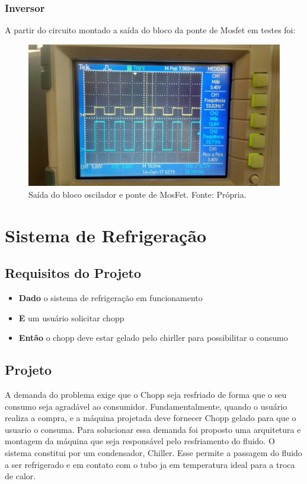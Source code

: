     \subsubsection[Inversor]{Inversor}
    
        A partir do circuito montado a saída do bloco da ponte de Mosfet em testes foi:
        
        \begin{figure}[!htb]
            \centering
            \includegraphics[scale= 0.2]{figuras/saida_inversor.jpg}
            \caption{Saída do bloco oscilador e ponte de MosFet. Fonte: Própria.}
            \label{saida-inversor}
        \end{figure}    

    \section[Sistema de Refrigeração]{Sistema de Refrigeração}
        \subsection[Requisitos do Projeto]{Requisitos do Projeto}
        
        \begin{itemize}
            \item \textbf{Dado} o sistema de refrigeração em funcionamento
            \item \textbf{E} um usuário solicitar chopp
            \item \textbf{Então} o chopp deve estar gelado pelo chirller para possibilitar o consumo
        \end{itemize}

        \subsection[Projeto]{Projeto}
            A demanda do problema exige que o Chopp seja resfriado de forma que o seu
            consumo seja agradável ao consumidor. Fundamentalmente, quando o usuário realiza
            a compra, e a máquina projetada deve fornecer Chopp gelado para que o usuario o
            consuma. Para solucionar essa demanda foi proposto uma arquitetura e montagem da
            máquina que seja responsável pelo resfriamento do fluido. O sistema constitui por um
            condensador, Chiller. Esse permite a passagem do fluido a ser refrigerado e em
            contato com o tubo ja em temperatura ideal para a troca de calor.

